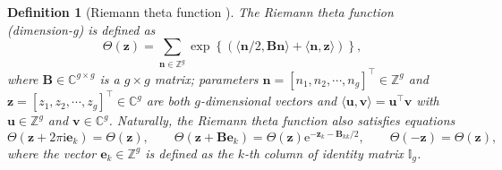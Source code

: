 \documentclass[11pt,reqno]{amsart}
\newcommand{\ii}{\mathrm{i}}
\newcommand{\ee}{\mathrm{e}}
\newtheorem{define}{Definition}
\numberwithin{equation}{section}
\begin{document}
\begin{define}[Riemann theta function {\cite[p.35]{BelokolosBME-1986}}]\label{define:Riemann-Theta-function}
	The Riemann theta function (dimension-g) is defined as 
	\begin{equation}\label{eq:define-Riemann-Theta}
		\Theta(\mathbf{z})=\sum_{\mathbf{n}\in \mathbb{Z}^g}\exp\left\{ \left(\langle \mathbf{n}/2, \mathbf{B}\mathbf{n}\rangle+\langle \mathbf{n},\mathbf{z}\rangle\right)\right\}, 
	\end{equation}
	where $\mathbf{B}\in \mathbb{C}^{g\times g}$ is a $g\times g$ matrix; parameters $\mathbf{n}=[n_1, n_2, \cdots, n_g]^{\top}\in \mathbb{Z}^g$ and $\mathbf{z}=[z_1, z_2, \cdots, z_g]^{\top}\in \mathbb{C}^g$ are both $g$-dimensional vectors and $\langle 
	\mathbf{u}, \mathbf{v} \rangle=\mathbf{u}^{\top}\mathbf{v}$ with $\mathbf{u}\in \mathbb{Z}^g$ and $\mathbf{v}\in \mathbb{C}^g$. 
	Naturally, the Riemann theta function also satisfies equations
	\begin{equation}\label{eq:Riemann-Theta-prop}
		\Theta(\mathbf{z}+2\pi \ii\mathbf{e}_k)=\Theta(\mathbf{z}), \qquad 
		\Theta(\mathbf{z}+ \mathbf{B}\mathbf{e}_k)=\Theta(\mathbf{z})\ee^{-\mathbf{z}_k-\mathbf{B}_{kk}/2}, \qquad 
		\Theta(-\mathbf{z})=\Theta(\mathbf{z}),
	\end{equation}
	where the vector $\mathbf{e}_k\in \mathbb{Z}^{g}$ is defined as the $k$-th column of identity matrix $\mathbb{I}_g$. 
\end{define}
\end{document}
